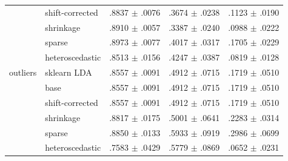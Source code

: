 \documentclass[conference]{IEEEtran}
\begin{document}
\begin{table}[t]
\begin{tabular}{llccc}
 & shift-corrected & .8837 $\pm$ .0076 & .3674 $\pm$ .0238 & .1123 $\pm$ .0190 \\
 & shrinkage & .8910 $\pm$ .0057 & .3387 $\pm$ .0240 & .0988 $\pm$ .0222 \\
 & sparse & .8973 $\pm$ .0077 & .4017 $\pm$ .0317 & .1705 $\pm$ .0229 \\
 & heteroscedastic & .8513 $\pm$ .0156 & .4247 $\pm$ .0387 & .0819 $\pm$ .0128 \\
\midrule
outliers & sklearn LDA & .8557 $\pm$ .0091 & .4912 $\pm$ .0715 & .1719 $\pm$ .0510 \\
 & base & .8557 $\pm$ .0091 & .4912 $\pm$ .0715 & .1719 $\pm$ .0510 \\
 & shift-corrected & .8557 $\pm$ .0091 & .4912 $\pm$ .0715 & .1719 $\pm$ .0510 \\
 & shrinkage & .8817 $\pm$ .0175 & .5001 $\pm$ .0641 & .2283 $\pm$ .0314 \\
 & sparse & .8850 $\pm$ .0133 & .5933 $\pm$ .0919 & .2986 $\pm$ .0699 \\
 & heteroscedastic & .7583 $\pm$ .0429 & .5779 $\pm$ .0869 & .0652 $\pm$ .0231 \\
\bottomrule
\end{tabular}
\end{table}
\end{document}
